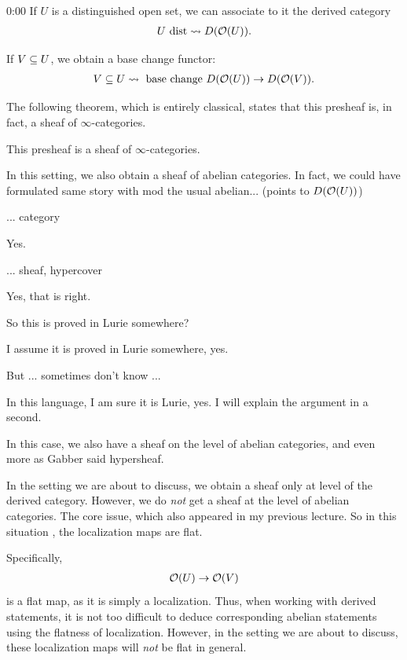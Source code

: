 \begin{unfinished}{0:00}
If $U$ is a distinguished open set, we can associate to it the derived category
\begin{align*}
U \text{ dist} \leadsto D(\mathcal O(U)).
\end{align*}

If $V \subseteq U$, we obtain a base change functor:
\begin{align*}
V \subseteq U \leadsto \text{ base change } D(\mathcal O(U)) \to D(\mathcal O(V)).
\end{align*}

The following theorem, which is entirely classical, states that this presheaf is, in fact, a sheaf of $\infty$-categories.

\begin{theorem}[Lurie]
This presheaf is a sheaf of $\infty$-categories.
\end{theorem}

In this setting, we also obtain a sheaf of abelian categories. In fact, we could have formulated same story with mod the usual abelian... (points to $D(\mathcal O(U))$)

\ques ... category 

\ans Yes. 

\ques ... sheaf, hypercover 

\ans Yes, that is right.

\ques So this is proved in Lurie somewhere?

\ans I assume it is proved in Lurie somewhere, yes.

\ques But ... sometimes don't know ...

\ans In this language, I am sure it is Lurie, yes. I will explain the argument in a second.

In this case, we also have a sheaf on the level of abelian categories, and even more as Gabber said hypersheaf. 

\begin{warning}
In the setting we are about to discuss, we obtain a sheaf only at level of the derived category. However, we do \emph{not} get a sheaf at the level of abelian categories.
The core issue, which also appeared in my previous lecture. So in this situation , the localization maps are flat.

Specifically,
\begin{align*}
\mathcal O(U) \to \mathcal O(V)
\end{align*}
is a flat map, as it is simply a localization.
Thus, when working with derived statements, it is not too difficult to deduce corresponding abelian statements using the flatness of localization. However, in the setting we are about to discuss, these localization maps will \emph{not} be flat in general.


\end{warning}
\end{unfinished}
